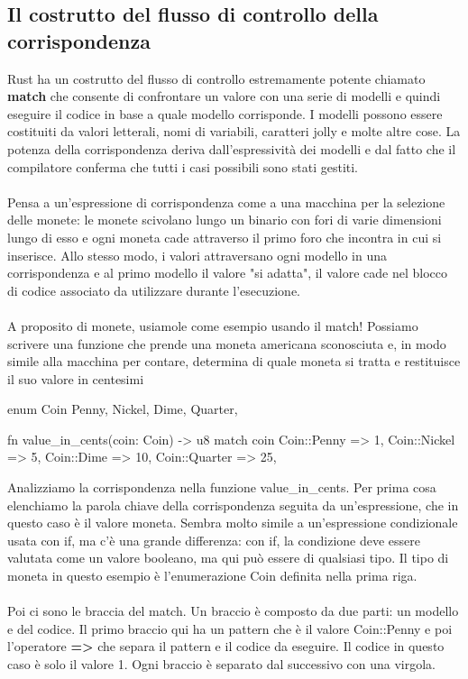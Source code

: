 \documentclass[11pt,a4paper]{article}
\begin{document}
\subsection{Il costrutto del flusso di controllo della corrispondenza}
Rust ha un costrutto del flusso di controllo estremamente potente chiamato \textbf{match} che consente di confrontare un valore con una serie di modelli e quindi eseguire il codice in base a quale modello corrisponde. I modelli possono essere costituiti da valori letterali, nomi di variabili, caratteri jolly e molte altre cose. La potenza della corrispondenza deriva dall'espressività dei modelli e dal fatto che il compilatore conferma che tutti i casi possibili sono stati gestiti.\\
\\
Pensa a un'espressione di corrispondenza come a una macchina per la selezione delle monete: le monete scivolano lungo un binario con fori di varie dimensioni lungo di esso e ogni moneta cade attraverso il primo foro che incontra in cui si inserisce. Allo stesso modo, i valori attraversano ogni modello in una corrispondenza e al primo modello il valore "si adatta", il valore cade nel blocco di codice associato da utilizzare durante l'esecuzione.\\
\\
A proposito di monete, usiamole come esempio usando il match! Possiamo scrivere una funzione che prende una moneta americana sconosciuta e, in modo simile alla macchina per contare, determina di quale moneta si tratta e restituisce il suo valore in centesimi
\begin{rust}
enum Coin {
    Penny,
    Nickel,
    Dime,
    Quarter,
}

fn value_in_cents(coin: Coin) -> u8 {
    match coin {
        Coin::Penny => 1,
        Coin::Nickel => 5,
        Coin::Dime => 10,
        Coin::Quarter => 25,
    }
}
\end{rust}
Analizziamo la corrispondenza nella funzione value\_in\_cents. Per prima cosa elenchiamo la parola chiave della corrispondenza seguita da un'espressione, che in questo caso è il valore moneta. Sembra molto simile a un'espressione condizionale usata con if, ma c'è una grande differenza: con if, la condizione deve essere valutata come un valore booleano, ma qui può essere di qualsiasi tipo. Il tipo di moneta in questo esempio è l'enumerazione Coin definita nella prima riga.\\
\\
Poi ci sono le braccia del match. Un braccio è composto da due parti: un modello e del codice. Il primo braccio qui ha un pattern che è il valore Coin::Penny e poi l'operatore \textbf{=>} che separa il pattern e il codice da eseguire. Il codice in questo caso è solo il valore 1. Ogni braccio è separato dal successivo con una virgola.\\
\end{document}
